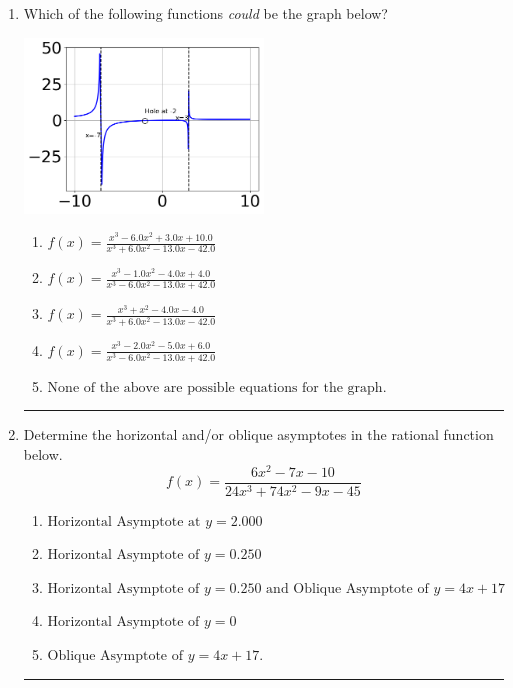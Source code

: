 \documentclass[14pt]{extbook}
\newcommand{\litem}[1]{\item#1\hspace*{-1cm}\rule{\textwidth}{0.4pt}}
\begin{document}
\begin{enumerate}
{\begin{enumerate}[label=\Alph*.]
\end{enumerate} }
\litem{
Which of the following functions \textit{could} be the graph below?
\begin{center}
    \includegraphics[width=0.5\textwidth]{../Figures/identifyGraphOfRationalFunctionCopyA.png}
\end{center}
\begin{enumerate}[label=\Alph*.]
\item \( f(x)=\frac{x^{3} -6.0 x^{2} +3.0 x + 10.0}{x^{3} +6.0 x^{2} -13.0 x -42.0} \)
\item \( f(x)=\frac{x^{3} -1.0 x^{2} -4.0 x + 4.0}{x^{3} -6.0 x^{2} -13.0 x + 42.0} \)
\item \( f(x)=\frac{x^{3} + x^{2} -4.0 x -4.0}{x^{3} +6.0 x^{2} -13.0 x -42.0} \)
\item \( f(x)=\frac{x^{3} -2.0 x^{2} -5.0 x + 6.0}{x^{3} -6.0 x^{2} -13.0 x + 42.0} \)
\item \( \text{None of the above are possible equations for the graph.} \)

\end{enumerate} }
\litem{
Determine the horizontal and/or oblique asymptotes in the rational function below.\[ f(x) = \frac{6x^{2} -7 x -10}{24x^{3} +74 x^{2} -9 x -45} \]\begin{enumerate}[label=\Alph*.]
\item \( \text{Horizontal Asymptote at } y = 2.000 \)
\item \( \text{Horizontal Asymptote of } y = 0.250  \)
\item \( \text{Horizontal Asymptote of } y = 0.250 \text{ and Oblique Asymptote of } y = 4x + 17 \)
\item \( \text{Horizontal Asymptote of } y = 0 \)
\item \( \text{Oblique Asymptote of } y = 4x + 17. \)


\end{enumerate}}
\end{enumerate}
\end{document}
